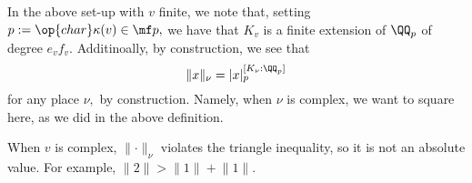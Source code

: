 In the above set-up with $v$ finite, we note that, setting $p:=\op{char}\kappa(v)\in\mf p,$ we have that $K_v$ is a finite extension of $\QQ_p$ of degree $e_vf_v.$ Additinoally, by construction, we see that
\[\lVert x\rVert_\nu=|x|_p^{[K_\nu:\QQ_p]}\]
for any place $\nu,$ by construction. Namely, when $\nu$ is complex, we want to square here, as we did in the above definition.
\begin{warn}
	When $v$ is complex, $\lVert\cdot\rVert_\nu$ violates the triangle inequality, so it is not an absolute value. For example, $\lVert2\rVert>\lVert1\rVert+\lVert1\rVert.$
\end{warn}